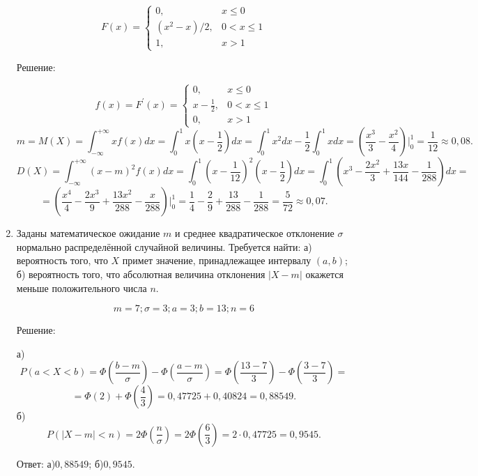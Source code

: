 \documentclass{article}
\renewcommand{\leq}{\ensuremath{\leqslant}}
\begin{document}
\begin{enumerate}
\begin{equation*}
F(x) =
 \begin{cases}
  0, & x\leq0\\
  (x^2-x)/2, & 0<x\leq1\\
  1, & x>1
 \end{cases}
\end{equation*}
\begin{center}Решение:\end{center}
\begin{equation*}
f(x) = F^{\prime}(x) =
 \begin{cases}
  0, & x\leq0\\
  x-\frac{1}{2}, & 0<x\leq1\\
  0, & x>1
 \end{cases}
\end{equation*}
$$m=M(X)=\int_{-\infty}^{+\infty} x f(x) dx=\int_{0}^{1} x\left(x-\frac{1}{2}\right) dx=\int_{0}^{1} x^2dx - \frac{1}{2}\int_{0}^{1} xdx=\left(\frac{x^3}{3}-\frac{x^2}{4}\right)\bigg|_{0}^{1}=\frac{1}{12}\approx0,08.$$
$$D(X)=\int_{-\infty}^{+\infty} (x-m)^2 f(x) dx=\int_{0}^{1} \left(x-\frac{1}{12}\right)^2\left(x-\frac{1}{2}\right) dx=\int_{0}^{1} \left(x^3-\frac{2x^2}{3}+\frac{13x}{144}-\frac{1}{288}\right) dx=$$
$$=\left(\frac{x^4}{4}-\frac{2x^3}{9}+\frac{13x^2}{288}-\frac{x}{288}\right)\bigg|_{0}^{1}=\frac{1}{4}-\frac{2}{9}+\frac{13}{288}-\frac{1}{288}=\frac{5}{72}\approx0,07.$$



\item %
Заданы математическое ожидание $m$ и среднее квадратическое отклонение $\sigma$ нормально распределённой случайной величины. \newline
Требуется найти: а) вероятность того, что $X$ примет значение, принадлежащее интервалу $(a, b)$; \newline
б) вероятность того, что абсолютная величина отклонения $|X-m|$ окажется меньше положительного числа $n$.

$$m=7;\sigma=3;a=3;b=13;n=6$$
\begin{center}Решение:\end{center}
а) $$P(a<X<b)=\Phi\left(\frac{b-m}{\sigma}\right)-\Phi\left(\frac{a-m}{\sigma}\right)=\Phi\left(\frac{13-7}{3}\right)-\Phi\left(\frac{3-7}{3}\right)=$$
$$=\Phi(2)+\Phi\left(\frac{4}{3}\right)=0,47725+0,40824=0,88549.$$
б)
$$P (|X-m| < n)= 2\Phi\left(\frac{n}{\sigma}\right)=2\Phi\left(\frac{6}{3}\right)=2\cdot0,47725=0,9545.$$

Ответ: а)$0,88549$; б)$0,9545$.


\end{enumerate}
\end{document}
